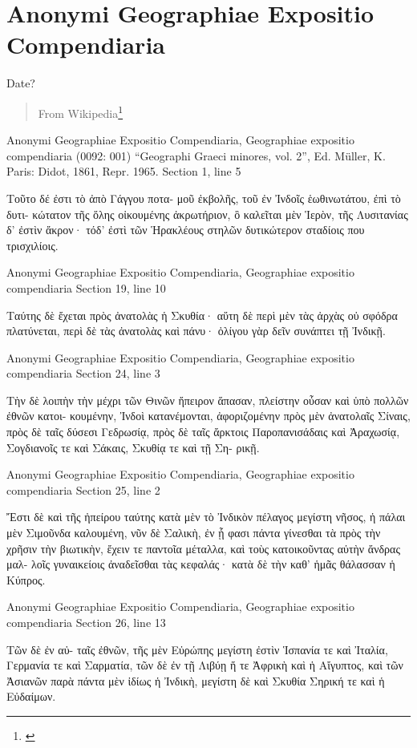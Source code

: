 \documentclass[12pt,letterpaper,twoside,final]{memoir}
\begin{document}
\section{Anonymi Geographiae Expositio Compendiaria}%
Date?
\blockquote[From Wikipedia\footnote{\url{}}]{}
\begin{greek}

Anonymi Geographiae Expositio Compendiaria, Geographiae expositio compendiaria (0092: 001)
“Geographi Graeci minores, vol. 2”, Ed. Müller, K.
Paris: Didot, 1861, Repr. 1965.
Section 1, line 5

                 Τοῦτο δέ ἐστι τὸ ἀπὸ Γάγγου ποτα-
μοῦ ἐκβολῆς, τοῦ ἐν Ἰνδοῖς ἑωθινωτάτου, ἐπὶ τὸ δυτι-
κώτατον τῆς ὅλης οἰκουμένης ἀκρωτήριον, ὃ καλεῖται 
μὲν Ἱερὸν, τῆς Λυσιτανίας δ' ἐστὶν ἄκρον· τόδ' ἐστὶ 
τῶν Ἡρακλέους στηλῶν δυτικώτερον σταδίοις που 
τρισχιλίοις. 



Anonymi Geographiae Expositio Compendiaria, Geographiae expositio compendiaria 
Section 19, line 10

                                   Ταύτης δὲ ἔχεται πρὸς 
ἀνατολὰς ἡ Σκυθία· αὕτη δὲ περὶ μὲν τὰς ἀρχὰς οὐ 
σφόδρα πλατύνεται, περὶ δὲ τὰς ἀνατολὰς καὶ πάνυ· 
ὀλίγου γὰρ δεῖν συνάπτει τῇ Ἰνδικῇ. 



Anonymi Geographiae Expositio Compendiaria, Geographiae expositio compendiaria 
Section 24, line 3

Τὴν δὲ λοιπὴν τὴν μέχρι τῶν Θινῶν ἤπειρον 
ἅπασαν, πλείστην οὖσαν καὶ ὑπὸ πολλῶν ἐθνῶν κατοι-
κουμένην, Ἰνδοὶ κατανέμονται, ἀφοριζομένην πρὸς 
μὲν ἀνατολαῖς Σίναις, πρὸς δὲ ταῖς δύσεσι Γεδρωσίᾳ, 
πρὸς δὲ ταῖς ἄρκτοις Παροπανισάδαις καὶ Ἀραχωσίᾳ, 
Σογδιανοῖς τε καὶ Σάκαις, Σκυθίᾳ τε καὶ τῇ Ση-
ρικῇ. 



Anonymi Geographiae Expositio Compendiaria, Geographiae expositio compendiaria 
Section 25, line 2

Ἔστι δὲ καὶ τῆς ἠπείρου ταύτης κατὰ μὲν τὸ 
Ἰνδικὸν πέλαγος μεγίστη νῆσος, ἡ πάλαι μὲν Σιμοῦνδα 
καλουμένη, νῦν δὲ Σαλικὴ, ἐν ᾗ φασι πάντα γίνεσθαι 
τὰ πρὸς τὴν χρῆσιν τὴν βιωτικὴν, ἔχειν τε παντοῖα 
μέταλλα, καὶ τοὺς κατοικοῦντας αὐτὴν ἄνδρας μαλ-
λοῖς γυναικείοις ἀναδεῖσθαι τὰς κεφαλάς· κατὰ δὲ τὴν 
καθ' ἡμᾶς θάλασσαν ἡ Κύπρος. 



Anonymi Geographiae Expositio Compendiaria, Geographiae expositio compendiaria 
Section 26, line 13

                                            Τῶν δὲ ἐν αὐ-  
ταῖς ἐθνῶν, τῆς μὲν Εὐρώπης μεγίστη ἐστὶν Ἱσπανία 
τε καὶ Ἰταλία, Γερμανία τε καὶ Σαρματία, τῶν δὲ 
ἐν τῇ Λιβύῃ ἥ τε Ἀφρικὴ καὶ ἡ Αἴγυπτος, καὶ τῶν 
Ἀσιανῶν παρὰ πάντα μὲν ἰδίως ἡ Ἰνδικὴ, μεγίστη δὲ 
καὶ Σκυθία Σηρική τε καὶ ἡ Εὐδαίμων. 




\end{greek}
\end{document}
